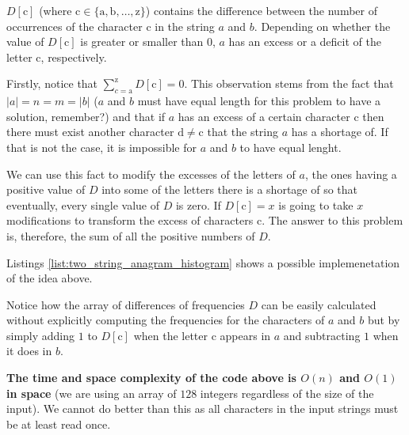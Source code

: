 $D[\mathrm{c}]$ (where $\mathrm{c} \in \{\mathrm{a},\mathrm{b},\ldots,\mathrm{z}\}$) contains the difference between the number of occurrences of the character $\mathrm{c}$ in the string $a$ and $b$. Depending on whether the value of $D[\mathrm{c}]$  is greater or smaller than $0$, $a$ has an excess or a deficit of the letter c, respectively.

Firstly, notice that $\sum_{c=\mathrm{a}}^{\mathrm{z}} D[\mathrm{c}] = 0$. This observation stems from the fact that $|a|=n=m=|b|$ ($a$ and $b$ must have equal length for this problem to have a solution, remember?) and that if $a$ has an excess of a certain character $\mathrm{c}$ then there must exist another character $\mathrm{d} \neq \mathrm{c}$ that the string $a$ has a shortage of. If that is not the case, it is impossible for $a$ and $b$ to have equal lenght.

We can use this fact to modify the excesses of the letters of $a$, the ones having a positive value of $D$ 
into some of the letters there is a shortage of so that eventually, every single value of $D$ is zero.
If $D[\mathrm{c}] = x$ is going to take $x$ modifications to transform the excess of characters $\mathrm{c}$.
The answer to this problem is, therefore, the sum of all the positive numbers of $D$. 

Listings \ref{list:two_string_anagram_histogram} shows a possible implemenetation of the idea above.




Notice how the array of differences of frequencies $D$ can be easily calculated without explicitly
computing the frequencies for the characters of $a$ and $b$ but by simply adding $1$ to $D[\mathrm{c}]$ when the letter $\mathrm{c}$ appears in $a$
and subtracting $1$ when it does in $b$. 

\textbf{The time and space complexity of the code above is $O(n)$ and $O(1)$ in space} (we are using an array of $128$ integers regardless of the size of the input). We cannot do better than this as all characters in the input strings must be at least read once.

